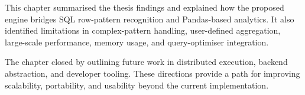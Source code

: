 This chapter summarised the thesis findings and explained how the
proposed engine bridges SQL row-pattern recognition and Pandas-based
analytics.  It also identified limitations in complex-pattern
handling, user-defined aggregation, large-scale performance, memory
usage, and query-optimiser integration.

The chapter closed by outlining future work in distributed execution,
backend abstraction, and developer tooling.  These directions provide
a path for improving scalability, portability, and usability beyond
the current implementation.
